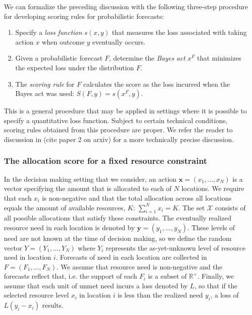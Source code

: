 \documentclass{article}
\def\elr#1{{\color{cyan}\textbf{ELR:[#1]}}}
\begin{document}
We can formalize the preceding discussion with the following three-step procedure for developing scoring rules for probabilistic forecasts:
\begin{enumerate}
\item Specify a \emph{loss function} $s(x, y)$ that measures the loss associated with taking action $x$ when outcome $y$ eventually occurs.
\item Given a probabilistic forecast $F$, determine the \emph{Bayes act} $x^F$ that minimizes the expected loss under the distribution $F$.
\item The \emph{scoring rule} for $F$ calculates the score as the loss incurred when the Bayes act was used: $S(F, y) = s(x^F, y)$.
\end{enumerate}
This is a general procedure that may be applied in settings where it is possible to specify a quantitative loss function. Subject to certain technical conditions, scoring rules obtained from this procedure are proper. We refer the reader to discussion in (cite paper 2 on arxiv) for a more technically precise discussion.




\subsubsection{The allocation score for a fixed resource constraint}
\label{sec:methods.detailed.specific_allocation}

In the decision making setting that we consider, an action $\mathbf{x} = (x_1, \ldots, x_N)$ is a vector specifying the amount that is allocated to each of $N$ locations. We require that each $x_i$ is non-negative and that the total allocation across all locations equals the amount of available resources, $K$: $\sum_{i=1}^N x_i = K$. The set $\mathcal{X}$ consists of all possible allocations that satisfy these constraints. The eventually realized resource need in each location is denoted by $\mathbf{y} = (y_1, \ldots, y_N)$. These levels of need are not known at the time of decision making, so we define the random vector $Y = (Y_1, \ldots, Y_N)$ where $Y_i$ represents the as-yet-unknown level of resource need in location $i$. Forecasts of need in each location are collected in $F = (F_1, \ldots, F_N)$. We assume that resource need is non-negative and the forecasts reflect that, i.e. the support of each $F_i$ is a subset of $\mathbb{R}^+$. Finally, we assume that each unit of unmet need incurs a loss denoted by $L$, so that if the selected resource level $x_i$ in location $i$ is less than the realized need $y_i$, a loss of $L(y_i - x_i)$ results.
\end{document}
